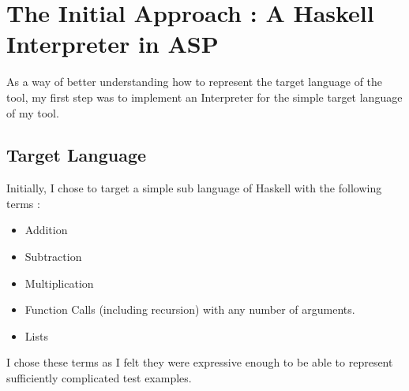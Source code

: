 \chapter{The Initial Approach : A Haskell Interpreter in ASP}

As a way of better understanding how to represent the target language of the tool, my first step was to implement an Interpreter for the simple target language of my tool.

\section{Target Language}

Initially, I chose to target a simple sub language of Haskell with the following terms :

\begin{itemize}
\item Addition
\item Subtraction
\item Multiplication
\item Function Calls (including recursion) with any number of arguments.
\item Lists
\end{itemize}

I chose these terms as I felt they were expressive enough to be able to represent sufficiently complicated test examples.\\ \\


